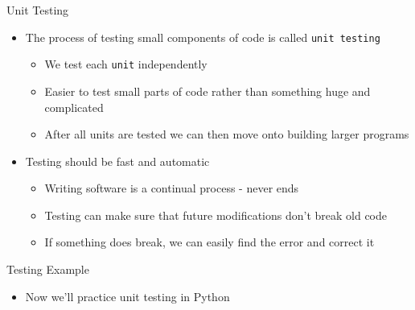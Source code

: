 \documentclass[11pt,professionalfonts]{beamer}
\begin{document}
\begin{frame}{Unit Testing}
    \begin{itemize}
        \item The process of testing small components of code is called \texttt{unit testing}
            \begin{itemize}
                \item We test each \texttt{unit} independently
                \item Easier to test small parts of code rather than something huge and complicated
                \item After all units are tested we can then move onto building larger programs
            \end{itemize}
        \item Testing should be fast and automatic
            \begin{itemize}
                \item Writing software is a continual process - never ends
                \item Testing can make sure that future modifications don't break old code 
                \item If something does break, we can easily find the error and correct it
            \end{itemize} 
    \end{itemize}
\end{frame}

\begin{frame}{Testing Example}
    \begin{itemize}
        \item Now we'll practice unit testing in Python
    \end{itemize}
\end{frame}
\end{document}
